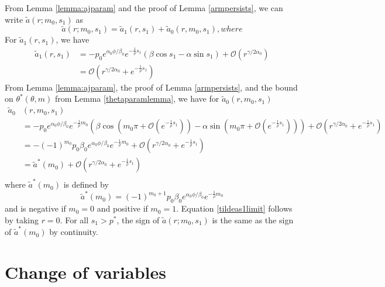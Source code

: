 \documentclass[thesis.tex]{subfiles}
\begin{document}
From Lemma \ref{lemma:ajparam} and the proof of Lemma \ref{armpersists}, we can write $\tilde{a}(r; m_0, s_1)$ as 
\[
\tilde{a}(r; m_0, s_1) = \tilde{a}_1(r, s_1) + \tilde{a}_0(r, m_0, s_1), where
\]
For $\tilde{a}_1(r, s_1)$, we have 
\begin{align*}
\tilde{a}_1(r, s_1) &= -p_0 e^{\alpha_0 \phi/\beta_0} e^{-\frac{1}{\rho}s_1} \left( \beta \cos s_1 - \alpha \sin s_1 \right) + \mathcal{O}(r^{\gamma/2\alpha_0}) \\
&= \mathcal{O}\left(r^{\gamma/2\alpha_0} + e^{-\frac{1}{\rho}s_1} \right)
\end{align*}
From Lemma \ref{lemma:ajparam}, the proof of Lemma \ref{armpersists}, and the bound on $\theta^*(\theta, m)$ from Lemma \ref{thetaparamlemma}, we have for $\tilde{a}_0(r, m_0, s_1)$
\begin{align*}
\tilde{a}_0&(r, m_0, s_1) \\
&= -p_0 e^{\alpha_0 \phi/\beta_0} e^{-\frac{1}{\rho}m_0} \left( \beta \cos\left(m_0 \pi + \mathcal{O}\left(e^{-\frac{1}{\rho}s_1} \right) \right) - \alpha \sin \left(m_0 \pi + \mathcal{O}\left(e^{-\frac{1}{\rho}s_1} \right) \right) \right) + \mathcal{O}\left(r^{\gamma/2\alpha_0} + e^{-\frac{1}{\rho}s_1} \right) \\
&= -(-1)^{m_0} p_0 \beta_0 e^{\alpha_0 \phi/\beta_0} e^{-\frac{1}{\rho}m_0} + \mathcal{O}\left(r^{\gamma/2\alpha_0} + e^{-\frac{1}{\rho}s_1} \right) \\
&= \tilde{a}^*(m_0) + \mathcal{O}\left(r^{\gamma/2\alpha_0} + e^{-\frac{1}{\rho}s_1} \right) \\
\end{align*}
where $\tilde{a}^*(m_0)$ is defined by
\[
\tilde{a}^*(m_0) = (-1)^{m_0 + 1} p_0 \beta_0 e^{\alpha_0 \phi/\beta_0} e^{-\frac{1}{\rho}m_0}
\]
and is negative if $m_0 = 0$ and positive if $m_0 = 1$. Equation \cref{tildeas1limit} follows by taking $r = 0$. For all $s_1 > p^*$, the sign of $\tilde{a}(r; m_0, s_1)$ is the same as the sign of $\tilde{a}^*(m_0)$ by continuity.

\section{Change of variables}
\end{document}
